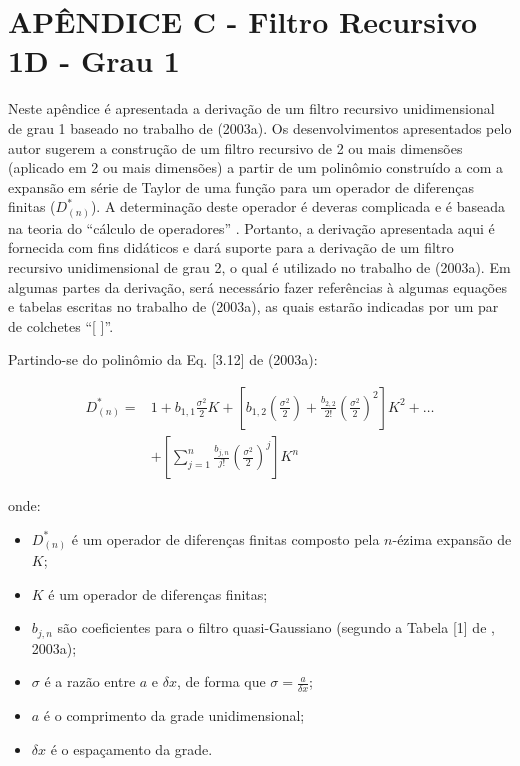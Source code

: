 
\chapter{APÊNDICE C - Filtro Recursivo 1D - Grau 1}
\label{apendiceIV}

Neste apêndice é apresentada a derivação de um filtro recursivo unidimensional de grau 1 baseado no trabalho de  (2003a). Os desenvolvimentos apresentados pelo autor sugerem a construção de um filtro recursivo de 2 ou mais dimensões (aplicado em 2 ou mais dimensões) a partir de um polinômio construído a com a expansão em série de Taylor de uma função para um operador de diferenças finitas ($D^{*}_{(n)}$). A determinação deste operador é deveras complicada e é baseada na teoria do ``cálculo de operadores'' \cite{dahlquistandbjorck/1974}. Portanto, a derivação apresentada aqui é fornecida com fins didáticos e dará suporte para a derivação de um filtro recursivo unidimensional de grau 2, o qual é utilizado no trabalho de  (2003a). Em algumas partes da derivação, será necessário fazer referências à algumas equações e tabelas escritas no trabalho de  (2003a), as quais estarão indicadas por um par de colchetes ``[ ]''.
 
Partindo-se do polinômio da Eq. [3.12] de  (2003a):

\begin{equation}
\label{apIV_eq:1}
  \begin{aligned}
  D^{*}_{(n)} = {} & 1 + b_{1,1} \frac{\sigma^{2}}{2} K + \left[ b_{1,2} \left(\frac{\sigma^{2}}{2}\right) + \frac{b_{2,2}}{2!} \left(\frac{\sigma^{2}}{2}\right)^2 \right] K^{2} + \dots \\
  & + \left[\sum_{j=1}^{n}{\frac{b_{j,n}}{j!} \left(\frac{\sigma^{2}}{2}\right)^{j} }\right] K^{n}
  \end{aligned}
\end{equation}

onde:

\begin{itemize}
	\item $D^{*}_{(n)}$ é um operador de diferenças finitas composto pela $n$-ézima expansão de $K$;
	\item $K$ é um operador de diferenças finitas;
	\item $b_{j,n}$ são coeficientes para o filtro quasi-Gaussiano (segundo a Tabela [1] de , 2003a);
	\item $\sigma$ é a razão entre $a$ e $\delta{x}$, de forma que $\sigma = \frac{a}{\delta{x}}$;
	\item $a$ é o comprimento da grade unidimensional;
	\item $\delta{x}$ é o espaçamento da grade.
\end{itemize}

